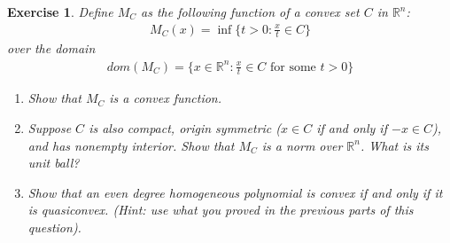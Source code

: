 \documentclass[12pt]{article}
\theoremstyle{colon}
\newtheorem{exercise}{Exercise}
\begin{document}
\clearpage

\begin{exercise}
  Define $M_C$ as the following function of a convex set $C$ in $\mathbb{R}^n$:
  \begin{gather*}
    M_C(x) = \inf \{ t > 0 : \frac{x}{t} \in C \}
  \end{gather*}
  over the domain
  \begin{gather*}
    dom(M_C) = \{ x \in \mathbb{R}^n : \frac{x}{t} \in C \text{ for some } t > 0 \}
  \end{gather*}
  \begin{enumerate}[label=\arabic*)]
    \item Show that $M_C$ is a convex function.
    \item Suppose $C$ is also compact, origin symmetric ($x \in C$ if and only if $-x \in C$), and has nonempty interior. Show that $M_C$ is a norm over $\mathbb{R}^n$. What is its unit ball?
    \item Show that an even degree homogeneous polynomial is convex if and only if it is quasiconvex. (Hint: use what you proved in the previous parts of this question).
  \end{enumerate}
\end{exercise}
\end{document}
